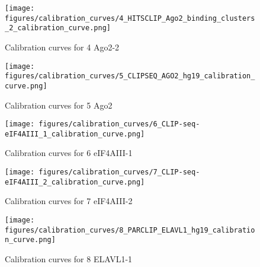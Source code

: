 \documentclass[11pt]{article}
\begin{document}
    
    
    \begin{figure}
        \begin{center}
            \texttt{[image: figures/calibration\_curves/4\_HITSCLIP\_Ago2\_binding\_clusters\_2\_calibration\_curve.png]}
            \caption{Calibration curves for 4 Ago2-2}
            \label{fig:calibration4 Ago2-2}
        \end{center}
    \end{figure}

    
    
    \begin{figure}
        \begin{center}
            \texttt{[image: figures/calibration\_curves/5\_CLIPSEQ\_AGO2\_hg19\_calibration\_curve.png]}
            \caption{Calibration curves for 5 Ago2}
            \label{fig:calibration5 Ago2}
        \end{center}
    \end{figure}

    
    
    \begin{figure}
        \begin{center}
            \texttt{[image: figures/calibration\_curves/6\_CLIP-seq-eIF4AIII\_1\_calibration\_curve.png]}
            \caption{Calibration curves for 6 eIF4AIII-1}
            \label{fig:calibration6 eIF4AIII-1}
        \end{center}
    \end{figure}

    
    
    \begin{figure}
        \begin{center}
            \texttt{[image: figures/calibration\_curves/7\_CLIP-seq-eIF4AIII\_2\_calibration\_curve.png]}
            \caption{Calibration curves for 7 eIF4AIII-2}
            \label{fig:calibration7 eIF4AIII-2}
        \end{center}
    \end{figure}

    
    
    \begin{figure}
        \begin{center}
            \texttt{[image: figures/calibration\_curves/8\_PARCLIP\_ELAVL1\_hg19\_calibration\_curve.png]}
            \caption{Calibration curves for 8 ELAVL1-1}
            \label{fig:calibration8 ELAVL1-1}
        \end{center}
    \end{figure}
\end{document}
